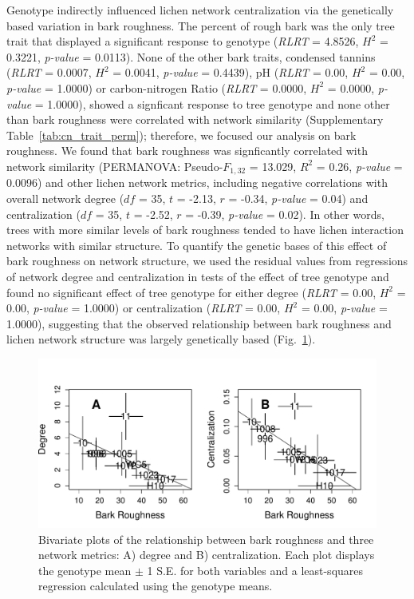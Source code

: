 \documentclass[11pt,twocolumn,twoside,lineno]{pnas-new}
\begin{document}
Genotype indirectly influenced lichen network centralization via the
genetically based variation in bark roughness. The percent of rough
bark was the only tree trait that displayed a significant response to
genotype (\textit{RLRT} = 4.8526, $H^2$ = 0.3221, \textit{p-value} =
0.0113). None of the other bark traits, condensed tannins
(\textit{RLRT} = 0.0007, $H^2$ = 0.0041, \textit{p-value} = 0.4439),
pH (\textit{RLRT} = 0.00, $H^2$ = 0.00, \textit{p-value} = 1.0000) or
carbon-nitrogen Ratio (\textit{RLRT} = 0.0000, $H^2$ = 0.0000,
\textit{p-value} = 1.0000), showed a signficant response to tree
genotype and none other than bark roughness were correlated with
network similarity (Supplementary Table~\ref{tab:cn_trait_perm});
therefore, we focused our analysis on bark roughness. We found that
bark roughness was signficantly correlated with network similarity
(PERMANOVA:  Pseudo-$F_{1,32}$ = 13.029, $R^2$ = 0.26,
\textit{p-value} = 0.0096) and other lichen network metrics, including
negative correlations with overall network degree ($df$ = 35, $t$ =
-2.13, $r$ = -0.34, \textit{p-value} = 0.04) and centralization ($df$
= 35, $t$ = -2.52, $r$ = -0.39, \textit{p-value} = 0.02). In other
words, trees with more similar levels of bark roughness tended to have
lichen interaction networks with similar structure. To quantify the
genetic bases of this effect of bark roughness on network structure,
we used the residual values from regressions of network degree and
centralization in tests of the effect of tree genotype and found no
significant effect of tree genotype for either degree (\textit{RLRT} =
0.00, $H^2$ = 0.00, \textit{p-value} = 1.0000) or centralization
(\textit{RLRT} = 0.00, $H^2$ = 0.00, \textit{p-value} = 1.0000),
suggesting that the observed relationship between bark roughness and
lichen network structure was largely genetically based
(Fig.~\ref{fig:br_net}).

\begin{figure}[ht]
\centering
\includegraphics[width=\linewidth]{br_net.pdf}
\caption{Bivariate plots of the relationship between bark roughness
  and three network metrics: A) degree and B) centralization. Each
  plot displays the genotype mean $\pm$ 1 S.E. for both variables and
  a least-squares regression calculated using the genotype means.}
\label{fig:br_net}
\end{figure}
\end{document}
